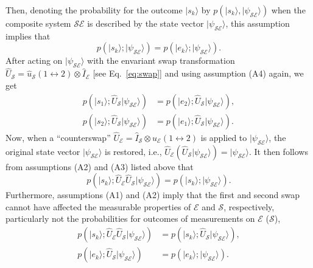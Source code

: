 \documentclass[twocolumn,rmp,aps,amsmath,amsfonts,noshowkeys,noshowpacs]{revtex4}
\newcommand{\ket}[1]{\ensuremath{|{#1\rangle}}}
\begin{document}
Then, denoting the probability for the outcome $\ket{s_k}$ by
$p(\ket{s_k}, \ket{\psi_\mathcal{SE}})$ when the composite system
$\mathcal{SE}$ is described by the state vector
$\ket{\psi_\mathcal{SE}}$, this assumption implies that
%
\begin{equation} \label{eq:1} 
p(\ket{s_k}; \ket{\psi_\mathcal{SE}}) = p(\ket{e_k};
\ket{\psi_\mathcal{SE}}).
\end{equation}
%
After acting on $\ket{\psi_\mathcal{SE}}$ with the envariant swap
transformation $\widehat{U}_\mathcal{S} = \widehat{u}_\mathcal{S}(1
\leftrightarrow 2) \otimes \widehat{I}_\mathcal{E}$ [see
Eq.~\eqref{eq:swap}] and using assumption (A4) again, we get
%
\begin{equation} \label{eq:2} 
\begin{split}
p(\ket{s_1}; \widehat{U}_\mathcal{S}\ket{\psi_\mathcal{SE}}) &= p(\ket{e_2};
\widehat{U}_\mathcal{S}\ket{\psi_\mathcal{SE}}), \\ p(\ket{s_2};
\widehat{U}_\mathcal{S}\ket{\psi_\mathcal{SE}}) &= p(\ket{e_1};
\widehat{U}_\mathcal{S}\ket{\psi_\mathcal{SE}}). 
\end{split}
\end{equation}
%
Now, when a ``counterswap'' $\widehat{U}_\mathcal{E} =
\widehat{I}_\mathcal{S} \otimes u_\mathcal{E}(1 \leftrightarrow 2)$ is
applied to $\ket{\psi_\mathcal{SE}}$, the original state vector
$\ket{\psi_\mathcal{SE}}$ is restored, i.e., $\widehat{U}_\mathcal{E}
(\widehat{U}_\mathcal{S} \ket{\psi_\mathcal{SE}}) =
\ket{\psi_\mathcal{SE}}$. It then follows from assumptions (A2) and
(A3) listed above that
%
\begin{equation} \label{eq:3} 
  p(\ket{s_k}; \widehat{U}_\mathcal{E} \widehat{U}_\mathcal{S}
  \ket{\psi_\mathcal{SE}}) = p(\ket{s_k}; \ket{\psi_\mathcal{SE}}).
\end{equation}
%
Furthermore, assumptions (A1) and (A2) imply that the first and second
swap cannot have affected the measurable properties of $\mathcal{E}$
and $\mathcal{S}$, respectively, particularly not the probabilities
for outcomes of measurements on $\mathcal{E}$ ($\mathcal{S}$),
%
\begin{equation} \label{eq:4}
\begin{split}
  p(\ket{s_k}; \widehat{U}_\mathcal{E} \widehat{U}_\mathcal{S}
  \ket{\psi_\mathcal{SE}}) &= p(\ket{s_k}; \widehat{U}_\mathcal{S}
  \ket{\psi_\mathcal{SE}}),\\
  p(\ket{e_k}; \widehat{U}_\mathcal{S} \ket{\psi_\mathcal{SE}}) &=
  p(\ket{e_k}; \ket{\psi_\mathcal{SE}}).
\end{split}
\end{equation}
\end{document}
